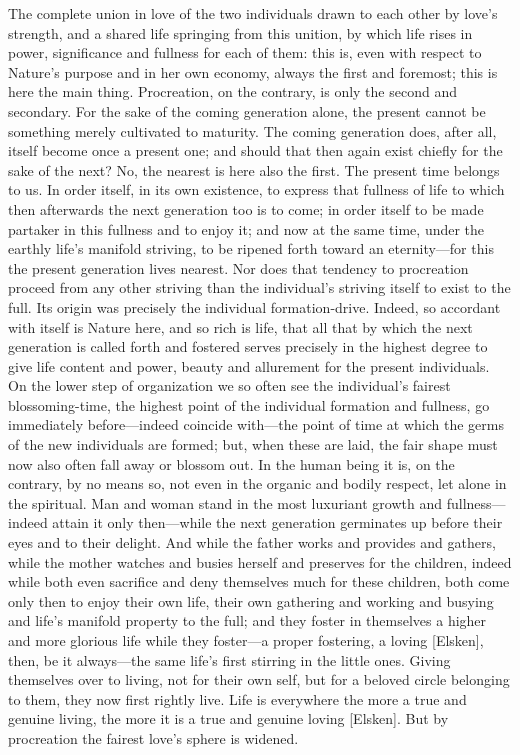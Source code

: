 \documentclass[12pt,a4paper]{book}
\begin{document}
The complete union in love of the two individuals drawn to each other by
love's strength, and a shared life springing from this unition, by which
life rises in power, significance and fullness for each of them: this is,
even with respect to Nature's purpose and in her own economy, always the
first and foremost; this is here the main thing. Procreation, on the
contrary, is only the second and secondary. For the sake of the coming
generation alone, the present cannot be something merely cultivated to
maturity. The coming generation does, after all, itself become once a
present one; and should that then again exist chiefly for the sake of the
next? No, the nearest is here also the first. The present time belongs to
us. In order itself, in its own existence, to express that fullness of life
to which then afterwards the next generation too is to come; in order
itself to be made partaker in this fullness and to enjoy it; and now at the
same time, under the earthly life's manifold striving, to be ripened forth
toward an eternity---for this the present generation lives nearest. Nor does
that tendency to procreation proceed from any other striving than the
individual's striving itself to exist to the full. Its origin was precisely
the individual formation-drive. Indeed, so accordant with itself is Nature
here, and so rich is life, that all that by which the next generation is
called forth and fostered serves precisely in the highest degree to give
life content and power, beauty and allurement for the present individuals.
On the lower step of organization we so often see the individual's fairest
blossoming-time, the highest point of the individual formation and
fullness, go immediately before---indeed coincide with---the point of time
at which the germs of the new individuals are formed; but, when these are
laid, the fair shape must now also often fall away or blossom out. In the
human being it is, on the contrary, by no means so, not even in the organic
and bodily respect, let alone in the spiritual. Man and woman stand in the
most luxuriant growth and fullness---indeed attain it only then---while the
next generation germinates up before their eyes and to their delight. And
while the father works and provides and gathers, while the mother watches
and busies herself and preserves for the children, indeed while both even
sacrifice and deny themselves much for these children, both come only then
to enjoy their own life, their own gathering and working and busying and
life's manifold property to the full; and they foster in themselves a
higher and more glorious life while they foster---a proper fostering, a
loving [Elsken], then, be it always---the same life's first stirring in the
little ones. Giving themselves over to living, not for their own self, but
for a beloved circle belonging to them, they now first rightly live. Life
is everywhere the more a true and genuine living, the more it is a true and
genuine loving [Elsken]. But by procreation the fairest love's sphere is
widened.
\end{document}
